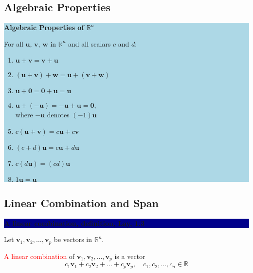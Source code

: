 \documentclass{article}
\begin{document}
\subsection{Algebraic Properties}
    \vspace{1cm}
    \begin{center}
    \colorbox{lightblue}{\parbox{0.9\textwidth}{
    \textbf{\color{cyan!80!black}Algebraic Properties of \(\mathbb{R}^n\)}

    For all \(\mathbf{u}\), \(\mathbf{v}\), \(\mathbf{w}\) in \(\mathbb{R}^n\) and all scalars \(c\) and \(d\):
    \begin{enumerate}
        \item \(\mathbf{u} + \mathbf{v} = \mathbf{v} + \mathbf{u}\)
        \item \((\mathbf{u} + \mathbf{v}) + \mathbf{w} = \mathbf{u} + (\mathbf{v} + \mathbf{w})\)
        \item \(\mathbf{u} + \mathbf{0} = \mathbf{0} + \mathbf{u} = \mathbf{u}\)
        \item \(\mathbf{u} + (-\mathbf{u}) = -\mathbf{u} + \mathbf{u} = \mathbf{0}\), \\
            where \(-\mathbf{u}\) denotes \((-1)\mathbf{u}\)
        \item \(c(\mathbf{u} + \mathbf{v}) = c\mathbf{u} + c\mathbf{v}\)
        \item \((c + d)\mathbf{u} = c\mathbf{u} + d\mathbf{u}\)
        \item \(c(d\mathbf{u}) = (cd)\mathbf{u}\)
        \item \(1\mathbf{u} = \mathbf{u}\)
    \end{enumerate}
    }}
    \end{center}

\subsection{Linear Combination and Span}
    \vspace{1cm}
    \colorbox{darkblue}{\parbox{\textwidth}{\centering \color{white}
    \Large\bfseries A linear combination, definition, Lay, 1.3
    }}
    \vspace{0.5cm}

    Let \(\mathbf{v}_1, \mathbf{v}_2, \ldots, \mathbf{v}_p\) be vectors in \(\mathbb{R}^n\).
    \vspace{0.5cm}

    \textcolor{red}{A linear combination} of \(\mathbf{v}_1, \mathbf{v}_2, \ldots, \mathbf{v}_p\) is a vector
    \[
    c_1\mathbf{v}_1 + c_2\mathbf{v}_2 + \dots + c_p\mathbf{v}_p, \quad c_1, c_2, \ldots, c_n \in \mathbb{R}
    \]
    \vspace{0.5cm}
\end{document}
